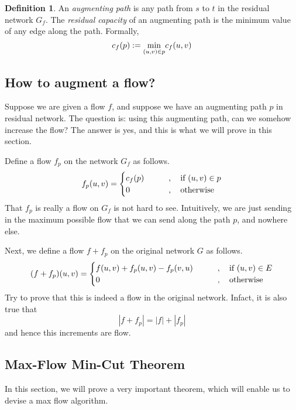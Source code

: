 \documentclass[12pt,a4paper]{amsart}
\numberwithin{equation}{section}
\theoremstyle{definition}
\newtheorem{Def}{Definition}[section]
\begin{document}
\begin{Def}
	An \textit{augmenting path} is any path from $s$ to $t$ in the residual network $G_f$. The \textit{residual capacity} of an augmenting path is the minimum value of any edge along the path. Formally, 
	$$c_f(p) := \underset{(u, v)\in p}{\text{min}}c_f(u, v)$$
\end{Def}

\subsection{How to augment a flow?} Suppose we are given a flow $f$, and suppose we have an augmenting path $p$ in residual network. The question is: using this augmenting path, can we somehow increase the flow? The answer is yes, and this is what we will prove in this section.

Define a flow $f_p$ on the network $G_f$ as follows. 
$$f_p(u, v) = 
	\begin{cases}
		c_f(p)\quad\quad &, \quad\text{if $(u, v)\in p$}\\
		0\quad\quad &, \quad\text{otherwise}
	\end{cases}
$$
That $f_p$ is really a flow on $G_f$ is not hard to see. Intuitively, we are just sending in the maximum possible flow that we can send along the path $p$, and nowhere else. 

Next, we define a flow $f + f_p$ on the original network $G$ as follows. 
$$(f + f_p)(u, v) = 
	\begin{cases}
		f(u, v) + f_p(u, v) - f_p(v, u)\quad\quad &,\quad\text{if $(u, v)\in E$}\\
		0\quad\quad &,\quad \text{otherwise}
	\end{cases}
$$
Try to prove that this is indeed a flow in the original network. Infact, it is also true that 
$$|f + f_p| = |f| + |f_p|$$
and hence this increments are flow. 

\subsection{Max-Flow Min-Cut Theorem}  In this section, we will prove a very important theorem, which will enable us to devise a max flow algorithm.
\end{document}
